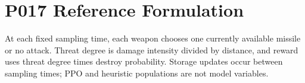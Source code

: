 \section*{P017 Reference Formulation}
At each fixed sampling time, each weapon chooses one currently available missile or no attack. Threat degree is damage intensity divided by distance, and reward uses threat degree times destroy probability. Storage updates occur between sampling times; PPO and heuristic populations are not model variables.

